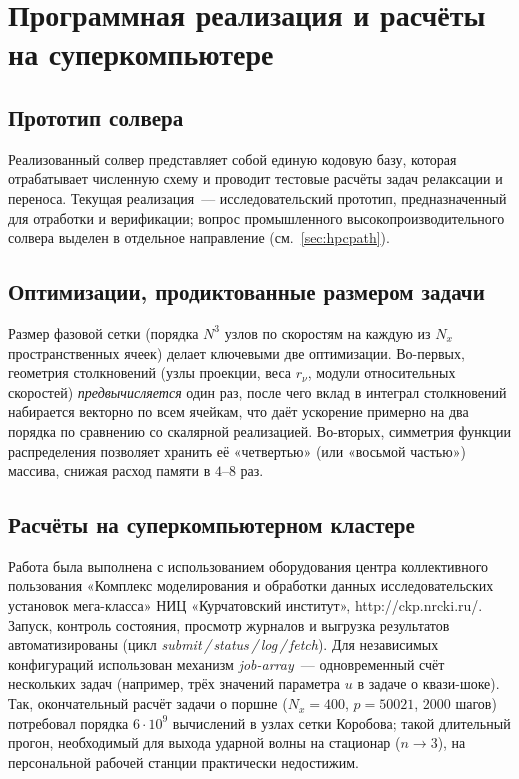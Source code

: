 \documentclass[14pt,a4paper]{extreport}
\numberwithin{equation}{chapter}
\numberwithin{figure}{chapter}
\numberwithin{table}{chapter}
\begin{document}
\chapter{Программная реализация и расчёты на суперкомпьютере}

\section{Прототип солвера}

Реализованный солвер представляет собой единую кодовую базу, которая отрабатывает численную схему и проводит тестовые
расчёты задач релаксации и переноса.
Текущая реализация~--- исследовательский прототип, предназначенный для отработки и верификации; вопрос промышленного
высокопроизводительного солвера выделен в отдельное направление (см.~\ref{sec:hpcpath}).

\section{Оптимизации, продиктованные размером задачи}

Размер фазовой сетки (порядка $N^3$ узлов по скоростям на каждую из $N_x$ пространственных ячеек) делает ключевыми две
оптимизации.
Во-первых, геометрия столкновений (узлы проекции, веса $r_\nu$, модули относительных скоростей) \emph{предвычисляется}
один раз, после чего вклад в интеграл столкновений набирается векторно по всем ячейкам, что даёт ускорение примерно на
два порядка по сравнению со скалярной реализацией.
Во-вторых, симметрия функции распределения позволяет хранить её «четвертью» (или «восьмой частью») массива, снижая
расход памяти в $4$--$8$ раз.

\section{Расчёты на суперкомпьютерном кластере}

Работа была выполнена с использованием оборудования центра коллективного пользования «Комплекс моделирования и обработки
данных исследовательских установок мега-класса» НИЦ «Курчатовский институт», http://ckp.nrcki.ru/.
Запуск, контроль состояния, просмотр журналов и выгрузка результатов автоматизированы (цикл
\emph{submit\,/\,status\,/\,log\,/\,fetch}).
Для независимых конфигураций использован механизм \emph{job-array}~--- одновременный счёт нескольких задач (например,
трёх значений параметра $u$ в задаче о квази-шоке).
Так, окончательный расчёт задачи о поршне ($N_x=400$, $p=50021$, $2000$ шагов) потребовал порядка $6\cdot10^{9}$
вычислений в узлах сетки Коробова; такой длительный прогон, необходимый для выхода ударной волны на стационар ($n\to3$),
на персональной рабочей станции практически недостижим.
\end{document}
